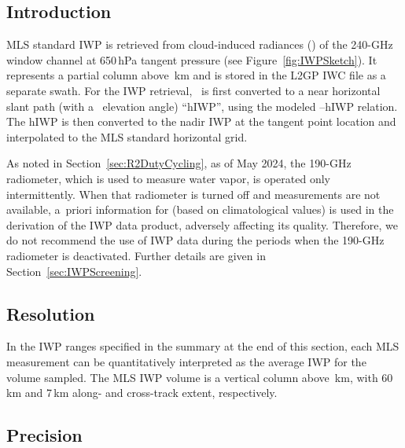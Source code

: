 
\subsection{Introduction}

MLS standard IWP is retrieved from cloud-induced radiances (\Tcir) of the 240\nobreakdash-GHz window channel at 650\,hPa tangent pressure (see Figure~\ref{fig:IWPSketch}). It represents a partial column above \,km and is stored in the \thisv L2GP IWC file as a separate swath. For the IWP retrieval, \Tcir\ is first converted to a near horizontal slant path (with a \degsym\ elevation angle) ``hIWP'', using the modeled \Tcir--hIWP relation. The hIWP is then converted to the nadir IWP at the tangent point location and interpolated to the MLS standard horizontal grid.

As noted in Section~\ref{sec:R2DutyCycling}, as of May 2024, the \mbox{190\nobreakdash-GHz} radiometer, which is used to measure water vapor, is operated only intermittently. When that radiometer is turned off and  measurements are not available, a~priori information for  (based on climatological values) is used in the derivation of the IWP data product, adversely affecting its quality. Therefore, we do not recommend the use of IWP data during the periods when the \mbox{190\nobreakdash-GHz} radiometer is deactivated. Further details are given in Section~\ref{sec:IWPScreening}.

\subsection{Resolution}

In the IWP ranges specified in the summary at the end of this section, each MLS measurement can be quantitatively interpreted as the average IWP for the volume sampled. The MLS IWP volume is a vertical column above \,km, with 60\,km and 7\,km along- and cross-track extent, respectively.

\subsection{Precision}


